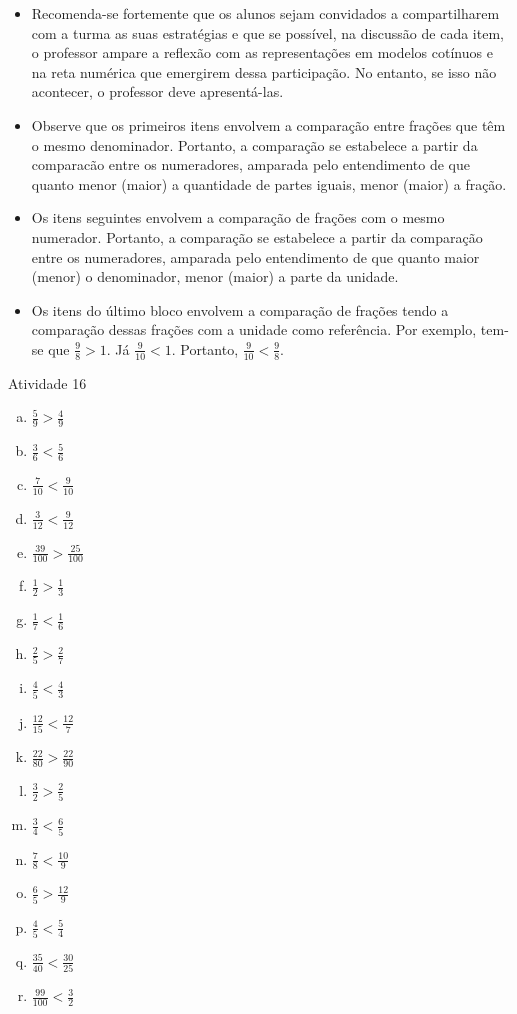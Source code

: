 \begin{multicols}{2}
\begin{itemize}
   \item Recomenda-se fortemente que os alunos sejam convidados a compartilharem com a turma as suas estratégias e que se possível, na discussão de cada item, o professor ampare a reflexão com as representações em modelos cotínuos e na reta numérica que emergirem dessa participação. No entanto, se isso não acontecer, o professor deve apresentá-las.  
   \item Observe que os primeiros itens envolvem a comparação entre frações que têm o mesmo denominador. Portanto, a comparação se estabelece a partir da comparacão entre os numeradores, amparada pelo entendimento de que quanto menor (maior) a quantidade de partes iguais, menor (maior) a fração.
   \item Os itens seguintes envolvem a comparação de frações com o mesmo numerador. Portanto, a comparação se estabelece a partir da comparação entre os numeradores, amparada pelo entendimento de que quanto maior (menor) o denominador, menor (maior) a parte da unidade.
   \item Os itens do último bloco envolvem a comparação de frações tendo a comparação dessas frações com a unidade como referência. Por exemplo, tem-se que $\frac{9}{8} > 1$. Já $\frac{9}{10} < 1$. Portanto, $\frac{9}{10}<\frac{9}{8}$.
\end{itemize}

\begin{resposta*}{Atividade 16}
\begin{enumerate}[a)]
 \item $\frac{5}{9} > \frac{4}{9}$ 
 \item $\frac{3}{6} < \frac{5}{6}$
\item   $\frac{7}{10} < \frac{9}{10}$    
\item  $\frac{3}{12} < \frac{9}{12}$    
\item $\frac{39}{100} > \frac{25}{100}$ 

\item   $\frac{1}{2} > \frac{1}{3}$     
\item  $\frac{1}{7} < \frac{1}{6}$     
\item   $\frac{2}{5} > \frac{2}{7}$    
\item   $\frac{4}{5} < \frac{4}{3}$    
\item   $\frac{12}{15} < \frac{12}{7}$ 
\item   $\frac{22}{80} > \frac{22}{90}$

\item   $\frac{3}{2} > \frac{2}{5}$    
\item   $\frac{3}{4} < \frac{6}{5}$    
\item   $\frac{7}{8} < \frac{10}{9}$   
\item   $\frac{6}{5} > \frac{12}{9}$   
\item  $\frac{4}{5}< \frac{5}{4}$     
\item  $\frac{35}{40}< \frac{30}{25}$ 
\item  $\frac{99}{100}<\frac{3}{2}$   
\end{enumerate}
\end{resposta*}



\end{multicols}
